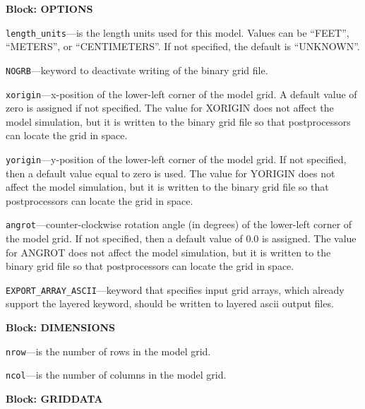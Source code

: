
\item \textbf{Block: OPTIONS}

\begin{description}
\item \texttt{length\_units}---is the length units used for this model.  Values can be ``FEET'', ``METERS'', or ``CENTIMETERS''.  If not specified, the default is ``UNKNOWN''.

\item \texttt{NOGRB}---keyword to deactivate writing of the binary grid file.

\item \texttt{xorigin}---x-position of the lower-left corner of the model grid.  A default value of zero is assigned if not specified.  The value for XORIGIN does not affect the model simulation, but it is written to the binary grid file so that postprocessors can locate the grid in space.

\item \texttt{yorigin}---y-position of the lower-left corner of the model grid.  If not specified, then a default value equal to zero is used.  The value for YORIGIN does not affect the model simulation, but it is written to the binary grid file so that postprocessors can locate the grid in space.

\item \texttt{angrot}---counter-clockwise rotation angle (in degrees) of the lower-left corner of the model grid.  If not specified, then a default value of 0.0 is assigned.  The value for ANGROT does not affect the model simulation, but it is written to the binary grid file so that postprocessors can locate the grid in space.

\item \texttt{EXPORT\_ARRAY\_ASCII}---keyword that specifies input grid arrays, which already support the layered keyword, should be written to layered ascii output files.

\end{description}
\item \textbf{Block: DIMENSIONS}

\begin{description}
\item \texttt{nrow}---is the number of rows in the model grid.

\item \texttt{ncol}---is the number of columns in the model grid.

\end{description}
\item \textbf{Block: GRIDDATA}

